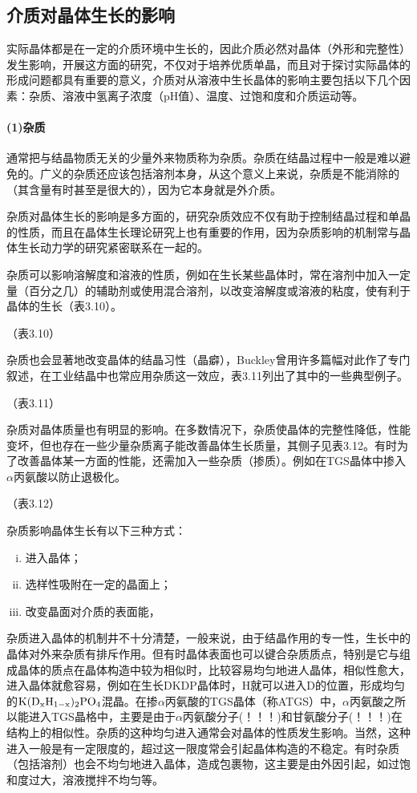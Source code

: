 \subsection{介质对晶体生长的影响}
实际晶体都是在一定的介质环境中生长的，因此介质必然对晶体（外形和完整性）发生影响，开展这方面的研究，不仅对于培养优质单晶，而且对于探讨实际晶体的形成问题都具有重要的意义，介质对从溶液中生长晶体的影响主要包括以下几个因素：杂质、溶液中氢离子浓度（pH值）、温度、过饱和度和介质运动等。

\paragraph{(1)杂质}通常把与结晶物质无关的少量外来物质称为杂质。杂质在结晶过程中一般是难以避免的。广义的杂质还应该包括溶剂本身，从这个意义上来说，杂质是不能消除的（其含量有时甚至是很大的），因为它本身就是外介质。

杂质对晶体生长的影响是多方面的，研究杂质效应不仅有助于控制结晶过程和单晶的性质，而且在晶体生长理论研究上也有重要的作用，因为杂质影响的机制常与晶体生长动力学的研究紧密联系在一起的。

杂质可以影响溶解度和溶液的性质，例如在生长某些晶体时，常在溶剂中加入一定量（百分之几）的辅助剂或使用混合溶剂，以改变溶解度或溶液的粘度，使有利于晶体的生长（表3.10）。

（表3.10）

杂质也会显著地改变晶体的结晶习性（晶癖），Buckley曾用许多篇幅对此作了专门叙述，在工业结晶中也常应用杂质这一效应，表3.11列出了其中的一些典型例子。

（表3.11）

杂质对晶体质量也有明显的影响。在多数情况下，杂质使晶体的完整性降低，性能变坏，但也存在一些少量杂质离子能改善晶体生长质量，其侧子见表3.12。有时为了改善晶体某一方面的性能，还需加入一些杂质（掺质）。例如在TGS晶体中掺入$\alpha$丙氨酸以防止退极化。

（表3.12）

杂质影响晶体生长有以下三种方式：
\begin{enumerate}[(i)]\itemsep -0.5ex
\item 进入晶体；
\item 选样性吸附在一定的晶面上；
\item 改变晶面对介质的表面能，
\end{enumerate}

杂质进入晶体的机制井不十分清楚，一般来说，由于结晶作用的专一性，生长中的晶体对外来杂质有排斥作用。但有时晶体表面也可以键合杂质质点，特别是它与组成晶体的质点在晶体构造中较为相似时，比较容易均匀地进人晶体，相似性愈大，进入晶体就愈容易，例如在生长DKDP晶体时，H就可以进入D的位置，形成均匀的$\rm K(D_xH_{1-x})_2PO_4$混晶。在掺$\alpha$丙氨酸的TGS晶体（称ATGS）中，$\alpha$丙氨酸之所以能进入TGS晶格中，主要是由于$\alpha$丙氨酸分子(！！！)和甘氨酸分子(！！！)在结构上的相似性。杂质的这种均匀进入通常会对晶体的性质发生影响。当然，这种进入一般是有一定限度的，超过这一限度常会引起晶体构造的不稳定。有时杂质（包括溶剂）也会不均匀地进入晶体，造成包裹物，这主要是由外因引起，如过饱和度过大，溶液搅拌不均匀等。

